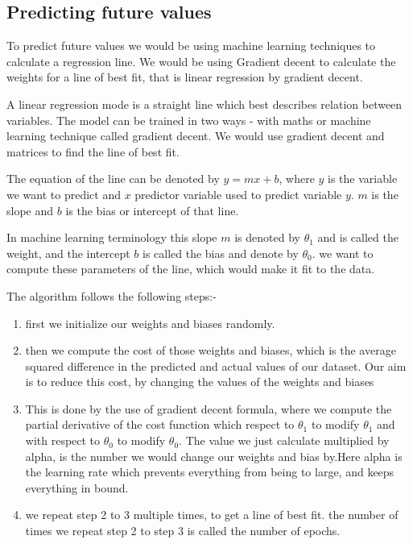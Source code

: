 \documentclass[a4paper, 11pt]{report}
\begin{document}
\subsection{Predicting future values}

To predict future values we would be using machine learning techniques to calculate a regression line. We would be using Gradient decent to calculate the weights for a line of best fit, that is linear regression by gradient decent.

A linear regression mode is a straight line which best describes relation between
variables. The model can be trained in two ways - with maths or machine learning
technique called gradient decent. We would use gradient decent and matrices to
find the line of best fit.

The equation of the line can be denoted by $y = mx + b$, where $y$ is the variable we want to
predict and $x$ predictor variable used to predict variable $y$. $m$ is the slope and $b$ is the bias or intercept of that line.

In machine learning terminology this slope $m$ is denoted by $\theta_1$ and is called the weight, and the intercept $b$ is called the bias and denote by $\theta_0$. we want to compute these parameters of the line, which would make it fit to the data.

The algorithm follows the following steps:- \\

\begin{enumerate}
    \item first we initialize our weights and biases randomly. \\

    \item then we compute the cost of those weights and biases, which is the
   average squared difference in the predicted and actual values of our
   dataset. Our aim is to reduce this cost, by changing the values of the weights
   and biases \\

   \item This is done by the use of gradient decent formula, where we compute
   the partial derivative of the cost function which respect to $\theta_1$
   to modify $\theta_1$ and with respect to $\theta_0$ to modify $\theta_0$. The
   value we just calculate multiplied by alpha, is the number we would
   change our weights and bias by.Here alpha is the learning rate which prevents everything from being to large, and keeps everything in bound. \\

   \item we repeat step 2 to 3 multiple times, to get a line of best fit. the
   number of times we repeat step 2 to step 3 is called the number of
   epochs. \\


\end{enumerate}
\end{document}

